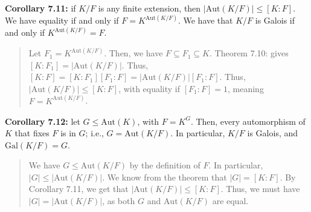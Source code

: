 \documentclass[10pt]{extarticle}
\begin{document}
  \textbf{Corollary 7.11:} if $K/F$ is any finite extension, then $|\text{Aut}(K/F)| \leq [K:F]$. We have equality if and only if $F = K^{\text{Aut}(K/F)}$. We have that $K/F$ is Galois if and only if $K^{\text{Aut}(K/F)} = F$.
  \begin{quote}
  Let $F_1 = K^{\text{Aut}(K/F)}$. Then, we have $F\subseteq F_1\subseteq K$. Theorem 7.10: gives $[K:F_1] = |\text{Aut}(K/F)|$. Thus, $[K:F] = [K:F_1][F_1:F] = |\text{Aut}(K/F)|[F_1:F]$. Thus, $|\text{Aut}(K/F)| \leq [K:F]$, with equality if $[F_1:F] = 1$, meaning $F = K^{\text{Aut}(K/F)}$.
  \end{quote}

  \textbf{Corollary 7.12:} let $G\leq \text{Aut}(K)$, with $F = K^{G}$. Then, every automorphism of $K$ that fixes $F$ is in $G$; i.e., $G = \text{Aut}(K/F)$. In particular, $K/F$ is Galois, and $\text{Gal}(K/F) = G$.
  \begin{quote}
  We have $G \leq \text{Aut}(K/F)$ by the definition of $F$. In particular, $|G| \leq |\text{Aut}(K/F)|$. We know from the theorem that $|G| = [K:F]$. By Corollary 7.11, we get that $|\text{Aut}(K/F)| \leq [K:F]$. Thus, we must have $|G| = |\text{Aut}(K/F)|$, as both $G$ and $\text{Aut}(K/F)$ are equal.
  \end{quote}
\end{document}
